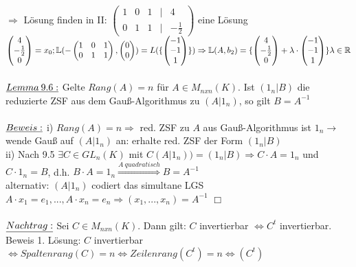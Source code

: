 \documentclass[fleqn, a4paper, 11pt]{article}
\begin{document}
$\Rightarrow$ L\"osung finden in II: $\begin{pmatrix}
	1 & 0 & 1 & | & 4 \\
	0 & 1 & 1 & | & -\tfrac{1}{2}
\end{pmatrix}$ eine L\"osung $\begin{pmatrix}
	4\\
	-\tfrac{1}{2}\\
	0
\end{pmatrix}=x_0;\mathbb{L}(-\begin{pmatrix}
	1 & 0 & 1\\
	0 & 1 & 1
\end{pmatrix},\begin{pmatrix}
	0\\
	0
\end{pmatrix})=L(\{\begin{pmatrix}
	-1 \\
	-1\\
	1
\end{pmatrix}\})\\
\Rightarrow\mathbb{L}(A,b_2)=\{\begin{pmatrix}
	4\\
	-\tfrac{1}{2}\\
	0
\end{pmatrix}+\lambda\cdot\begin{pmatrix}
	-1\\
	-1\\
	1
\end{pmatrix}\} \lambda\in\mathbb{R}$\\
\\
$\uline{Lemma\:9.6:}$ Gelte $Rang(A)=n$ f\"ur $A\in M_{nxn}(K)$. Ist $(1_n|B)$ die reduzierte ZSF aus dem Gau\ss{}-Algorithmus zu $(A|1_n)$, so gilt $B=A^{-1}$\\
\\
$\uline{Beweis:}$ i) $Rang(A)=n\Rightarrow$ red. ZSF zu $A$ aus Gau\ss{}-Algorithmus ist $1_n\rightarrow$ wende Gau\ss{} auf $(A|1_n)$ an: erhalte red. ZSF der Form $(1_n|B)$\\
ii) Nach 9.5 $\exists C\in GL_n(K)$ mit $C(A|1_n))=(1_n|B)\Rightarrow C\cdot A=1_n$ und $C\cdot 1_n=B$, d.h. $B\cdot A=1_n\stackrel{A\:quadratisch}{\Rightarrow}B=A^{-1}$\\
alternativ: $(A|1_n)$ codiert das simultane LGS $A\cdot x_1=e_1,...,A\cdot x_n=e_n\Rightarrow(x_1,...,x_n)=A^{-1}$ \hfill $\Box$\\
\\
$\uline{Nachtrag:}$ Sei $C\in M_{nxn}(K)$. Dann gilt: $C$ invertierbar $\Leftrightarrow C^t$ invertierbar. Beweis 1. L\"osung: $C$ invertierbar $\Leftrightarrow Spaltenrang(C)=n\Leftrightarrow Zeilenrang(C^t)=n\Leftrightarrow (C^t)$\\
\end{document}
